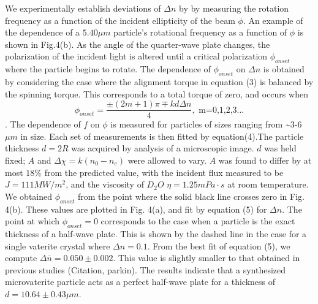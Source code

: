{We experimentally establish deviations of $\Delta n$ by by measuring the rotation frequency as a function of the incident ellipticity of the beam $\phi.$ An example of the dependence of a $5.40 \mu m$ particle's rotational frequency as a function of $\phi$ is shown in Fig.4(b). As the angle of the quarter-wave plate changes, the polarization of the incident light is altered until a critical polarization $\phi_{onset}$ where the particle begins to rotate. The dependence of  $\phi_{onset}$ on $\Delta n$ is obtained by considering the case where the alignment torque in equation (3) is balanced by the spinning torque. This corresponds to a total torque of zero, and occurs when 
\begin{equation}
\phi_{onset}=\frac{\pm(2m+1)\pi\mp kd\Delta n}{4} , \text{  m=0,1,2,3...}
\end{equation}. The dependence of $f$ on $\phi$ is measured for particles of sizes ranging from \textasciitilde 3-6$\mu m$ in size. Each set
of measurements is then fitted by equation(4).The particle thickness $d=2R$ was acquired by analysis of a microscopic image. $d$ was held fixed; $A$ and $\Delta\chi=k(n_{0}-n_{e})$ were allowed to vary. $A$ was found
to differ by at most $18\%$ from the predicted value, with the incident flux measured to be $J=111 MW/m^2$, and the viscosity of $D_{2}O$ $\eta=1.25mPa\cdot s$ at room temperature. We obtained $\phi_{onset}$ from the point where the solid black line crosses zero in Fig. 4(b). These values are plotted in Fig. 4(a), and fit by equation (5) for $\Delta n$. The point at which $\phi_{onset}=0$ corresponds to the case when a particle is the exact thickness of a half-wave plate. This is shown by the dashed line in the case for a single vaterite crystal where $\Delta n=0.1$.  From the best fit of equation (5), we compute $\Delta\bar{n}=0.050\pm 0.002$. This value is slightly smaller to that obtained in previous studies (Citation, parkin). The results indicate that a synthesized microvaterite particle acts as a perfect half-wave plate for a thickness of $d=10.64\pm 0.43 \mu m$.


}
